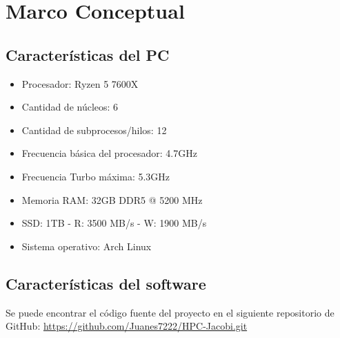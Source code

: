 
\section{Marco Conceptual}
\label{sec:Marco Conceptual}

\subsection{Características del PC}
\label{sec:Características del PC} 

\begin{itemize}
   \item Procesador: Ryzen 5 7600X
   \item Cantidad de núcleos: 6
   \item Cantidad de subprocesos/hilos: 12
   \item Frecuencia básica del procesador: 4.7GHz
   \item Frecuencia Turbo máxima: 5.3GHz
   \item Memoria RAM: 32GB DDR5 @ 5200 MHz
   \item SSD: 1TB - R: 3500 MB/s - W: 1900 MB/s
   \item Sistema operativo: Arch Linux
\end{itemize}

\subsection{Características del software}

Se puede encontrar el código fuente del proyecto en el siguiente repositorio de GitHub: \url{https://github.com/Juanes7222/HPC-Jacobi.git}